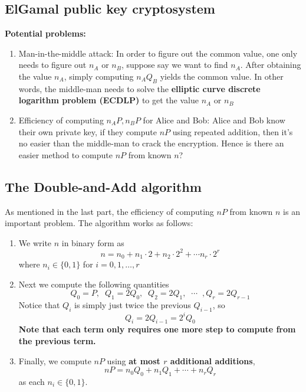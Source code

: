 \documentclass[a4 paper]{article}
\newcommand{\?}{\stackrel{?}{=}}
\begin{document}
\subsection{ElGamal public key cryptosystem}


\begin{note}{\bcicosaedre}
\textbf{Potential problems: } 
\begin{enumerate}
    \item  Man-in-the-middle attack: In order to figure out the common value, one only needs to figure out $ n_A $ or $ n_B $, suppose say we want to find $ n_A $. After obtaining the value $ n_A $, simply computing $ n_A Q_B $ yields the common value. In other words, the middle-man needs to solve the \textbf{elliptic curve discrete logarithm problem (ECDLP)}  to get the value $ n_A $  or $ n_B $
    \item  Efficiency of computing $ n_A P, n_B P $ for Alice and Bob: Alice and Bob know their own private key, if they compute $ nP $ using repeated addition, then it's no easier than the middle-man to crack the encryption. Hence is there an easier method to compute $ nP $ from known $ n $?  
\end{enumerate}
\end{note}

\subsection{The Double-and-Add algorithm}
As mentioned in the last part, the efficiency of computing $ nP $ from known $ n $ is an important problem. The algorithm works as follows: 
\begin{enumerate}
    \item We write $ n $ in binary form as 
    $$ n = n_0 + n_1 \cdot 2 + n_2 \cdot 2^2 + \cdots n_r \cdot 2^r  $$ 
    where $ n_i \in \{0,1\} $ for $ i = 0 , 1, \dots, r $
    \item Next we compute the following quantities 
    $$ Q_0 = P, \;\; Q_1 = 2Q_0, \;\; Q_2 = 2Q_1, \;\; \cdots \;\;, Q_r = 2Q_{r-1}  $$
    Notice that $ Q_i $ is simply just twice the previous $ Q_{i-1} $, so 
    $$ Q_i = 2 Q_{i-1} = 2^i Q_0 $$
    \textbf{Note that each term only requires one more step to compute from the previous term.} 
    \item Finally, we compute $ nP $ using \textbf{at most $ r $ additional additions}, 
    $$ nP = n_0 Q_0 + n_1 Q_1 + \cdots + n_r Q_r $$
    as each $ n_i \in \{0,1\} $. 
\end{enumerate}
\end{document}
